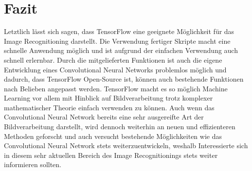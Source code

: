 \section{Fazit}
\label{sec:Fazit}
Letztlich lässt sich sagen, dass TensorFlow eine geeignete Möglichkeit für das Image Recognitioning darstellt. Die Verwendung fertiger Skripte macht eine schnelle Anwendung möglich und ist aufgrund der einfachen Verwendung auch schnell erlernbar. Durch die mitgelieferten Funktionen ist auch die eigene Entwicklung eines Convolutional Neural Networks problemlos möglich und dadurch, dass TensorFlow Open-Source ist, können auch bestehende Funktionen nach Belieben angepasst werden. TensorFlow macht es so möglich Machine Learning vor allem mit Hinblick auf Bildverarbeitung trotz komplexer mathematischer Theorie einfach verwenden zu können. Auch wenn das Convolutional Neural Network bereits eine sehr ausgereifte Art der Bildverarbeitung darstellt, wird dennoch weiterhin an neuen und effizienteren Methoden geforscht und auch versucht bestehende Möglichkeiten wie das Convolutional Neural Network stets weiterzuentwickeln, weshalb Interessierte sich in diesem sehr aktuellen Bereich des Image Recognitionings stets weiter informieren sollten.